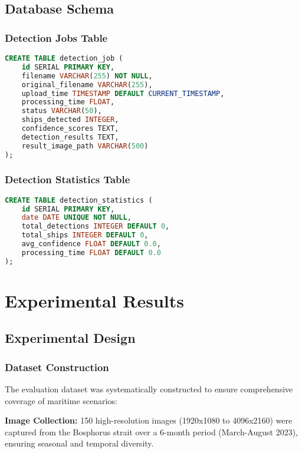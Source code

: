 \documentclass[12pt,a4paper]{report}
\begin{document}
\section{Database Schema}

\subsection{Detection Jobs Table}
\begin{lstlisting}[language=SQL, caption=Detection Jobs Schema]
CREATE TABLE detection_job (
    id SERIAL PRIMARY KEY,
    filename VARCHAR(255) NOT NULL,
    original_filename VARCHAR(255),
    upload_time TIMESTAMP DEFAULT CURRENT_TIMESTAMP,
    processing_time FLOAT,
    status VARCHAR(50),
    ships_detected INTEGER,
    confidence_scores TEXT,
    detection_results TEXT,
    result_image_path VARCHAR(500)
);
\end{lstlisting}

\subsection{Detection Statistics Table}
\begin{lstlisting}[language=SQL, caption=Statistics Schema]
CREATE TABLE detection_statistics (
    id SERIAL PRIMARY KEY,
    date DATE UNIQUE NOT NULL,
    total_detections INTEGER DEFAULT 0,
    total_ships INTEGER DEFAULT 0,
    avg_confidence FLOAT DEFAULT 0.0,
    processing_time FLOAT DEFAULT 0.0
);
\end{lstlisting}

\chapter{Experimental Results}

\section{Experimental Design}

\subsection{Dataset Construction}
The evaluation dataset was systematically constructed to ensure comprehensive coverage of maritime scenarios:

\textbf{Image Collection:} 150 high-resolution images (1920x1080 to 4096x2160) were captured from the Bosphorus strait over a 6-month period (March-August 2023), ensuring seasonal and temporal diversity.
\end{document}
